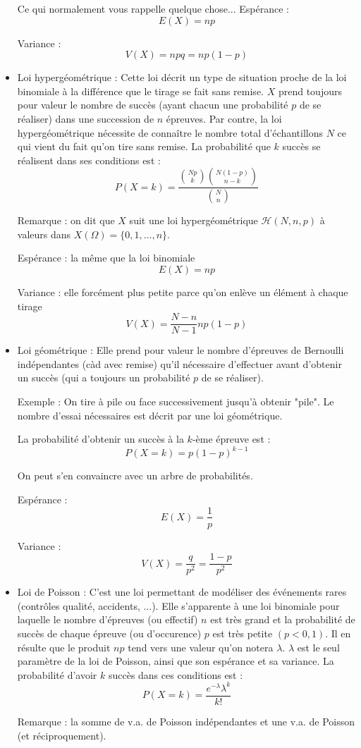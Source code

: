 \begin{itemize}
    Ce qui normalement vous rappelle quelque chose...
    Espérance :
    \[
    E(X)=n p
    \]
    
    Variance :
    \[
    V(X)=n p q=n p(1-p)
    \]
    \item Loi hypergéométrique : Cette loi décrit un type de situation proche de la loi binomiale à la différence que le tirage se fait sans remise. \(X\) prend toujours pour valeur le nombre de succès (ayant chacun une probabilité \(p\) de se réaliser) dans une succession de \(n\) épreuves. Par contre, la loi hypergéométrique nécessite de connaître le nombre total d'échantillons \(N\) ce qui vient du fait qu'on tire sans remise. La probabilité que \(k\) succès se réalisent dans ses conditions est :
    \[
    P(X=k)=\frac{\binom{N p}{k}\binom{N(1-p)}{n-k}}{\binom{N}{n}}
    \]
    
    Remarque : on dit que \(X\) suit une loi hypergéométrique \(\mathcal{H}(N, n, p)\) à valeurs dans \(X(\Omega)= \{0,1, \ldots, n\}\).
    
    Espérance : la même que la loi binomiale
    \[
    E(X)=n p
    \]
    
    Variance : elle forcément plus petite parce qu'on enlève un élément à chaque tirage
    \[
    V(X)=\frac{N-n}{N-1} n p(1-p)
    \]
    \item Loi géométrique : Elle prend pour valeur le nombre d'épreuves de Bernoulli indépendantes (càd avec remise) qu'il nécessaire d'effectuer avant d'obtenir un succès (qui a toujours un probabilité \(p\) de se réaliser).
    
    Exemple : On tire à pile ou face successivement jusqu'à obtenir "pile". Le nombre d'essai nécessaires est décrit par une loi géométrique.
    
    La probabilité d'obtenir un succès à la \(k\)-ème épreuve est :
    \[
    P(X=k)=p(1-p)^{k-1}
    \]
    
    On peut s'en convaincre avec un arbre de probabilités.
    
    Espérance :
    \[
    E(X)=\frac{1}{p}
    \]
    
    Variance :
    \[
    V(X)=\frac{q}{p^{2}}=\frac{1-p}{p^{2}}
    \]
    \item Loi de Poisson : C'est une loi permettant de modéliser des événements rares (contrôles qualité, accidents, ...). Elle s'apparente à une loi binomiale pour laquelle le nombre d'épreuves (ou effectif) \(n\) est très grand et la probabilité de succès de chaque épreuve (ou d'occurence) \(p\) est très petite \((p<0,1)\). Il en résulte que le produit \(n p\) tend vers une valeur qu'on notera \(\lambda\). \(\lambda\) est le seul paramètre de la loi de Poisson, ainsi que son espérance et sa variance. La probabilité d'avoir \(k\) succès dans ces conditions est :
    \[
    P(X=k)=\frac{e^{-\lambda} \lambda^{k}}{k!}
    \]
    
    Remarque : la somme de v.a. de Poisson indépendantes et une v.a. de Poisson (et réciproquement).
\end{itemize}
